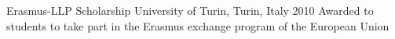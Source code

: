   \mycvhonor
    {Erasmus-LLP Scholarship} %
    {University of Turin, Turin, Italy} %
    {2010} %
    {
      Awarded to students to take part in the Erasmus exchange program of the European Union
    } %

